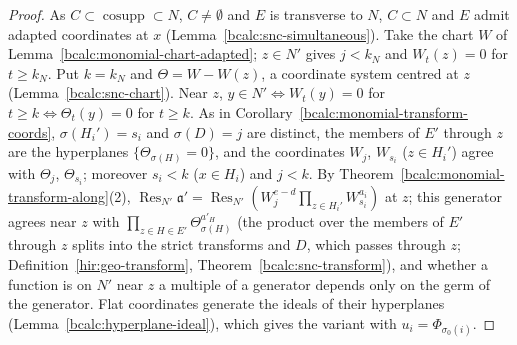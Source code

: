 \begin{proof}
\leanok
As \(C\subset\operatorname{cosupp}\subset N\), \(C\ne\emptyset\) and \(E\) is transverse to \(N\), \(C\subset N\) and \(E\) admit adapted coordinates at \(x\)
(Lemma~\ref{bcalc:snc-simultaneous}). Take the chart \(W\) of Lemma~\ref{bcalc:monomial-chart-adapted}; \(z\in N'\) gives \(j<k_N\) and \(W_t(z)=0\) for
\(t\ge k_N\). Put \(k=k_N\) and \(\Theta=W-W(z)\), a coordinate system centred at \(z\) (Lemma~\ref{bcalc:snc-chart}). Near \(z\), \(y\in N'\iff W_t(y)=0\)
for \(t\ge k\iff\Theta_t(y)=0\) for \(t\ge k\). As in Corollary~\ref{bcalc:monomial-transform-coords}, \(\sigma(H_i')=s_i\) and \(\sigma(D)=j\) are distinct, the
members of \(E'\) through \(z\) are the hyperplanes \(\{\Theta_{\sigma(H)}=0\}\), and the coordinates \(W_j\), \(W_{s_i}\) (\(z\in H_i'\)) agree with
\(\Theta_j\), \(\Theta_{s_i}\); moreover \(s_i<k\) (\(x\in H_i\)) and \(j<k\). By Theorem~\ref{bcalc:monomial-transform-along}(2),
\(\operatorname{Res}_{N'}\mathfrak a'=\operatorname{Res}_{N'}(W_j^{e-d}\prod_{z\in H_i'}W_{s_i}^{a_i})\) at \(z\); this generator agrees near \(z\) with
\(\prod_{z\in H\in E'}\Theta_{\sigma(H)}^{a'_H}\) (the product over the members of \(E'\) through \(z\) splits into the strict transforms and \(D\), which passes
through \(z\); Definition~\ref{hir:geo-transform}, Theorem~\ref{bcalc:snc-transform}), and whether a function is on \(N'\) near \(z\) a multiple of a
generator depends only on the germ of the generator. Flat coordinates generate the ideals of their hyperplanes (Lemma~\ref{bcalc:hyperplane-ideal}),
which gives the variant with \(u_i=\Phi_{\sigma_0(i)}\).
\end{proof}

